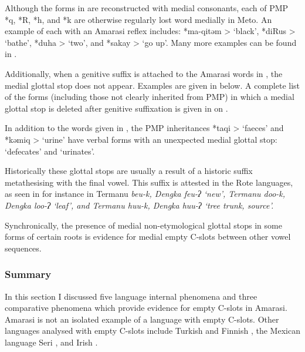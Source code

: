Although the forms in  are
reconstructed with medial consonants,
each of PMP *q, *R, *h, and *k are otherwise regularly lost word medially in Meto.
An example of each with an Amarasi reflex includes: *ma-qitəm >  `black',
*diRus >  `bathe', *duha >  `two', and *sakay >  `go up'.
Many more examples can be found in \citet{ed16b}.

Additionally, when a genitive suffix is attached to
the Amarasi words in ,
the medial glottal stop does not appear.
Examples are given in  below.
A complete list of the forms (including those not clearly inherited from PMP)
in which a medial glottal stop is deleted after genitive suffixation
is given in  on .

\begin{exe}
	\label{ex:MedGloStoDel}
\end{exe}

In addition to the words given in ,
the PMP inheritances *taqi >  `faeces' 
and  *kəmiq >  `urine' have verbal forms
with an unexpected medial glottal stop:  `defecates'
and  `urinates'.

Historically these glottal stops are usually a result
of a historic suffix metathesising with the final vowel.
This suffix is attested in the Rote languages,
as seen in for instance in Termanu \it{beu-k}, Dengka \it{feu-ʔ} `new',
Termanu \it{doo-k}, Dengka \it{loo-ʔ} `leaf', and
Termanu \it{huu-k}, Dengka \it{huu-ʔ} `tree trunk, source'.

Synchronically, the presence of medial non-etymological
glottal stops in some forms of certain roots is evidence
for medial empty C-slots between other vowel sequences.

\subsubsection{Summary}
In this section I discussed five language internal phenomena
and three comparative phenomena which provide evidence for
empty C-slots in Amarasi.
Amarasi is not an isolated example of a language with empty C-slots.
Other languages analysed with empty C-slots include Turkish and Finnish \citep{clke83},
the Mexican language Seri \citep{mast83}, and Irish \citep{an16}.


